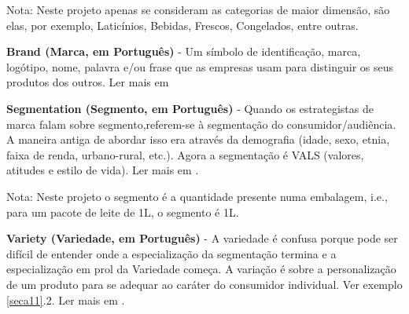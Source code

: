 {\footnotesize Nota: Neste projeto apenas se consideram as categorias de maior dimensão, são elas, por exemplo, Laticínios, Bebidas, Frescos, Congelados, entre outras.}

\vspace{0.2cm}
\textbf{Brand (Marca, em Português)} - Um símbolo de identificação, marca, logótipo, nome, palavra e/ou frase que as empresas usam para distinguir os seus produtos dos outros. Ler mais em \cite{investopedia:brandDefinition2018}

\vspace{0.2cm}
\textbf{Segmentation (Segmento, em Português)} - Quando os estrategistas de marca falam sobre segmento,referem-se à segmentação do consumidor/audiência. A maneira antiga de abordar isso era através da demografia (idade, sexo, etnia, faixa de renda, urbano-rural, etc.). Agora a segmentação é VALS (valores, atitudes e estilo de vida). Ler mais em \cite{sphereoi:itemIdentification2018}.

{\footnotesize Nota: Neste projeto o segmento é a quantidade presente numa embalagem, i.e., para um pacote de leite de 1L, o segmento é 1L.}


\vspace{0.2cm}
\textbf{Variety (Variedade, em Português)} - A variedade é confusa porque pode ser difícil de entender onde a especialização da segmentação termina e a especialização em prol da Variedade começa. A variação é sobre a personalização de um produto para se adequar ao caráter do consumidor individual. Ver exemplo \ref{seca11}.2. Ler mais em \cite{sphereoi:itemIdentification2018}.

\vspace{0.5cm}

\noindent{}

%
%
	
